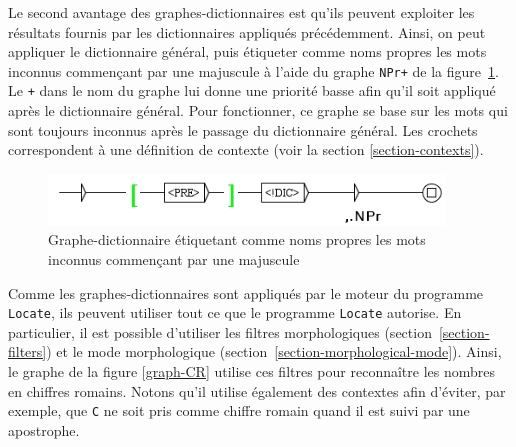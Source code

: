 \bigskip
\noindent Le second avantage des graphes-dictionnaires est qu’ils peuvent exploiter les résultats
fournis par les dictionnaires appliqués précédemment. Ainsi, on peut appliquer le dictionnaire
général, puis étiqueter comme noms propres les mots inconnus commençant par une majuscule à l’aide
du graphe \verb$NPr+$ de la figure~\ref{graph-NPr}. Le \verb$+$ dans le nom du graphe lui donne une
priorité basse afin qu’il soit appliqué après le dictionnaire général. Pour fonctionner, ce graphe
se base sur les mots qui sont toujours inconnus après le passage du dictionnaire général. Les
crochets correspondent à une définition de contexte (voir la section \ref{section-contexts}).

\begin{figure}[!h]
\begin{center}
\includegraphics[width=10.5cm]{resources/img/fig3-13.png}
\caption{Graphe-dictionnaire étiquetant comme noms propres les mots inconnus commençant par une
majuscule
\label{graph-NPr}}
\end{center}
\end{figure}

\bigskip
\noindent Comme les graphes-dictionnaires sont appliqués par le moteur du programme \verb+Locate+,
ils peuvent utiliser tout ce que le programme \verb+Locate+ autorise. En particulier, il est
possible d’utiliser les filtres morphologiques (section~\ref{section-filters}) et le mode morphologique (section~\ref{section-morphological-mode}).
Ainsi, le graphe de la figure \ref{graph-CR} utilise ces filtres pour reconnaître les nombres en
chiffres romains. Notons qu’il utilise également des contextes afin d’éviter, par exemple, que
\verb+C+ ne soit pris comme chiffre romain quand il est suivi par une apostrophe.

